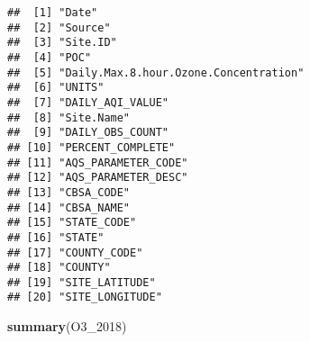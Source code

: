 \documentclass[]{article}
\newenvironment{Shaded}{\begin{snugshade}}{\end{snugshade}}
\newcommand{\KeywordTok}[1]{\textcolor[rgb]{0.13,0.29,0.53}{\textbf{#1}}}
\newcommand{\DecValTok}[1]{\textcolor[rgb]{0.00,0.00,0.81}{#1}}
\newcommand{\NormalTok}[1]{#1}
\begin{document}
\begin{verbatim}
##  [1] "Date"                                
##  [2] "Source"                              
##  [3] "Site.ID"                             
##  [4] "POC"                                 
##  [5] "Daily.Max.8.hour.Ozone.Concentration"
##  [6] "UNITS"                               
##  [7] "DAILY_AQI_VALUE"                     
##  [8] "Site.Name"                           
##  [9] "DAILY_OBS_COUNT"                     
## [10] "PERCENT_COMPLETE"                    
## [11] "AQS_PARAMETER_CODE"                  
## [12] "AQS_PARAMETER_DESC"                  
## [13] "CBSA_CODE"                           
## [14] "CBSA_NAME"                           
## [15] "STATE_CODE"                          
## [16] "STATE"                               
## [17] "COUNTY_CODE"                         
## [18] "COUNTY"                              
## [19] "SITE_LATITUDE"                       
## [20] "SITE_LONGITUDE"
\end{verbatim}

\begin{Shaded}
\begin{Highlighting}[]
\KeywordTok{summary}\NormalTok{(O3_}\DecValTok{2018}\NormalTok{)}
\end{Highlighting}
\end{Shaded}
\end{document}
